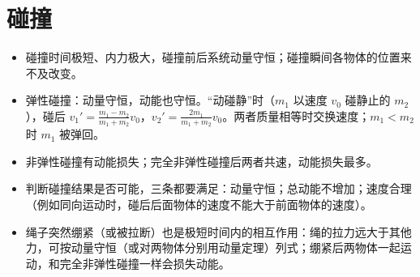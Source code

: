 \documentclass[\gkver]{gaokaozhenti}
\begin{document}
\section{碰撞}
\begin{yaodian}
\begin{itemize}
\item 碰撞时间极短、内力极大，碰撞前后系统动量守恒；碰撞瞬间各物体的位置来不及改变。
\item 弹性碰撞：动量守恒，动能也守恒。“动碰静”时（$m_{1}$ 以速度 $v_{0}$ 碰静止的 $m_{2}$），碰后 $v_{1}'=\frac{m_{1}-m_{2}}{m_{1}+m_{2}}v_{0}$，$v_{2}'=\frac{2m_{1}}{m_{1}+m_{2}}v_{0}$。两者质量相等时交换速度；$m_{1}<m_{2}$ 时 $m_{1}$ 被弹回。
\item 非弹性碰撞有动能损失；完全非弹性碰撞后两者共速，动能损失最多。
\item 判断碰撞结果是否可能，三条都要满足：动量守恒；总动能不增加；速度合理（例如同向运动时，碰后后面物体的速度不能大于前面物体的速度）。
\item 绳子突然绷紧（或被拉断）也是极短时间内的相互作用：绳的拉力远大于其他力，可按动量守恒（或对两物体分别用动量定理）列式；绷紧后两物体一起运动，和完全非弹性碰撞一样会损失动能。
\end{itemize}
\end{yaodian}
\end{document}
